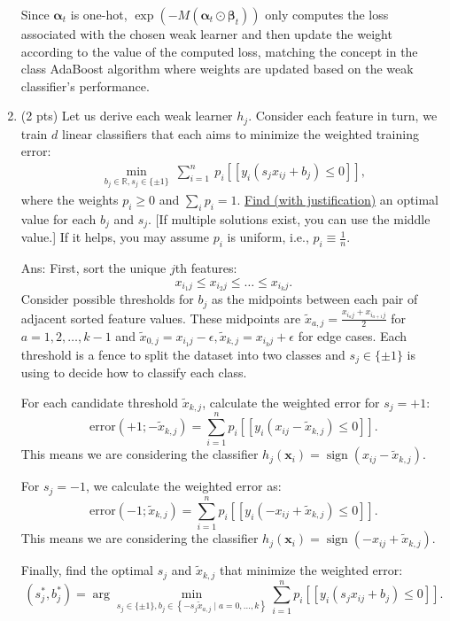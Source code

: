 \documentclass[10pt]{article}
\newcommand{\xv}{\mathbf{x}}
\newcommand{\RR}{\mathds{R}}
\newcommand{\alphav}{\boldsymbol{\alpha}}
\newcommand{\betav}{\boldsymbol{\beta}}
\newcommand{\ans}[1]{{\color{blue}\textsf{Ans}: #1}}
\newcommand{\pred}[1]{[\![#1]\!]}
\newcommand{\sign}{\mathop{\mathrm{sign}}}
\begin{document}
\begin{exercise}
\begin{enumerate}
		      Since $\alphav_t$ is one-hot, $\exp(-M (\alphav_t \odot \betav_t))$ only computes the loss associated with the chosen weak learner and then update the weight according to the value of the computed loss, matching the concept in the class AdaBoost algorithm where weights are updated based on the weak classifier's performance.

		      \newpage

		\item (2 pts) Let us derive each weak learner $h_j$. Consider each feature in turn, we train $d$ linear classifiers that each aims to minimize the weighted training error:
		      \begin{align}
			      \min_{b_j\in \RR, s_j \in \{\pm1\}} ~ \sum_{i=1}^n ~ p_i \pred{ y_i (s_j x_{ij} + b_j) \leq 0  },
		      \end{align}
		      where the weights $p_i \geq 0$ and $\sum_i p_i = 1$.
		      \uline{Find (with justification)} an optimal value for each $b_j$ and $s_j$. [If multiple solutions exist, you can use the middle value.]
		      If it helps, you may assume $p_i$ is uniform, i.e., $p_i \equiv \tfrac1n$.

		      \ans

		      First, sort the unique $j$th features:
		      $$ x_{i_1j} \le x_{i_2j} \le \ldots \le x_{i_kj}.$$
		      Consider possible thresholds for $ b_j $ as the midpoints between each pair of adjacent sorted feature values. These midpoints are $ \tilde{x}_{a,j} = \frac{x_{i_aj} + x_{i_{a+1}j}}{2} $ for $ a = 1, 2, \ldots, k-1 $ and $\tilde{x}_{0,j}=x_{i_1j}-\epsilon, \tilde{x}_{k,j}=x_{i_kj}+\epsilon$ for edge cases. Each threshold is a fence to split the dataset into two classes and $ s_j \in \{\pm1\} $ is using to decide how to classify each class.

		      For each candidate threshold $ \tilde{x}_{k,j} $, calculate the weighted error for $ s_j = +1 $:
		      $$
			      \text{error}(+1; -\tilde{x}_{k,j}) = \sum_{i=1}^n p_i \pred{ y_i (x_{ij} - \tilde{x}_{k,j}) \leq 0 }.
		      $$
		      This means we are considering the classifier $ h_j(\xv_i) = \sign(x_{ij} - \tilde{x}_{k,j}) $.

		      For $ s_j = -1 $, we calculate the weighted error as:
		      $$
			      \text{error}(-1; \tilde{x}_{k,j}) = \sum_{i=1}^n p_i \pred{ y_i (-x_{ij} + \tilde{x}_{k,j}) \leq 0 }.
		      $$
		      This means we are considering the classifier $ h_j(\xv_i) = \sign(-x_{ij} + \tilde{x}_{k,j}) $.

		      Finally, find the optimal $ s_j $ and $ \tilde{x}_{k,j} $ that minimize the weighted error:
		      $$
			      \boxed{(s_j^*, b_j^*) = \arg\min_{s_j \in \{\pm1\}, b_j \in \left\{-s_j\tilde{x}_{a,j} \mid a = 0, \ldots, k\right\}} \sum_{i=1}^n p_i \pred{ y_i (s_j x_{ij} + b_j) \leq 0 }}.
		      $$


\end{enumerate}
\end{exercise}
\end{document}
